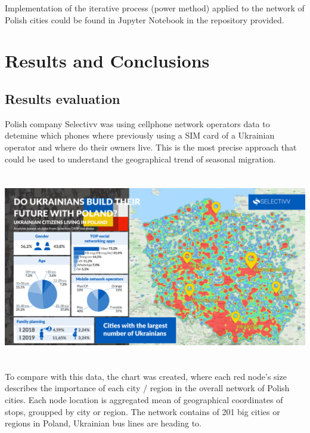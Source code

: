 Implementation of the iterative process (power method) applied to the network of Polish cities could be found in Jupyter Notebook in the repository provided.

\section{Results and Conclusions}
 
 \subsection{Results evaluation}
 
 Polish company Selectivv was using cellphone network operators data to detemine which phones where previously using a SIM card of a Ukrainian operator and where do their owners live. This is the most precise approach that could be used to understand the geographical trend of seasonal migration.
 \newline
 \newline
 \includegraphics[height=9cm]{selectiv_research.png}\\[1cm]
 \newline
 \newline
 To compare with this data, the chart was created, where each red node's size describes the importance of each city / region in the overall network of Polish cities. Each node location is aggregated mean of geographical coordinates of stops, groupped by city or region. The network contains of 201 big cities or regions in Poland, Ukrainian bus lines are heading to.
 \newline
 \newline
